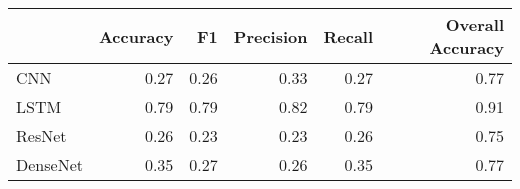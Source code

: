 \begin{tabular}{lrrrrr}
\toprule
{} &  Accuracy &    F1 &  Precision &  Recall &  Overall Accuracy \\
\midrule
CNN      &      0.27 &  0.26 &       0.33 &    0.27 &              0.77 \\
LSTM     &      0.79 &  0.79 &       0.82 &    0.79 &              0.91 \\
ResNet   &      0.26 &  0.23 &       0.23 &    0.26 &              0.75 \\
DenseNet &      0.35 &  0.27 &       0.26 &    0.35 &              0.77 \\
\bottomrule
\end{tabular}
